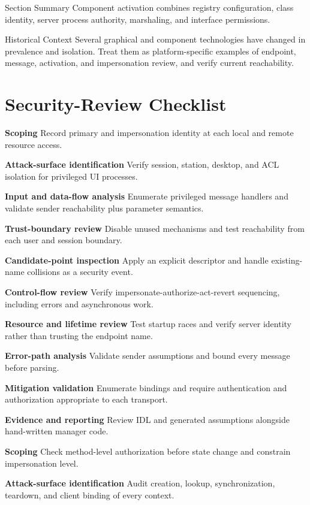 \documentclass[11pt,letterpaper]{article}
\begin{document}
\begin{CornellSummaryBox}{Section Summary}
Component activation combines registry configuration, class identity, server process authority, marshaling, and interface permissions.
\end{CornellSummaryBox}
\begin{CornellLegacyBox}{Historical Context}
Several graphical and component technologies have changed in prevalence and isolation. Treat them as platform-specific examples of endpoint, message, activation, and impersonation review, and verify current reachability.
\end{CornellLegacyBox}
\section{Security-Review Checklist}
\begin{CornellChecklist}
\item \textbf{Scoping}
Record primary and impersonation identity at each local and remote resource access.
\item \textbf{Attack-surface identification}
Verify session, station, desktop, and ACL isolation for privileged UI processes.
\item \textbf{Input and data-flow analysis}
Enumerate privileged message handlers and validate sender reachability plus parameter semantics.
\item \textbf{Trust-boundary review}
Disable unused mechanisms and test reachability from each user and session boundary.
\item \textbf{Candidate-point inspection}
Apply an explicit descriptor and handle existing-name collisions as a security event.
\item \textbf{Control-flow review}
Verify impersonate-authorize-act-revert sequencing, including errors and asynchronous work.
\item \textbf{Resource and lifetime review}
Test startup races and verify server identity rather than trusting the endpoint name.
\item \textbf{Error-path analysis}
Validate sender assumptions and bound every message before parsing.
\item \textbf{Mitigation validation}
Enumerate bindings and require authentication and authorization appropriate to each transport.
\item \textbf{Evidence and reporting}
Review IDL and generated assumptions alongside hand-written manager code.
\item \textbf{Scoping}
Check method-level authorization before state change and constrain impersonation level.
\item \textbf{Attack-surface identification}
Audit creation, lookup, synchronization, teardown, and client binding of every context.
\end{CornellChecklist}
\end{document}

